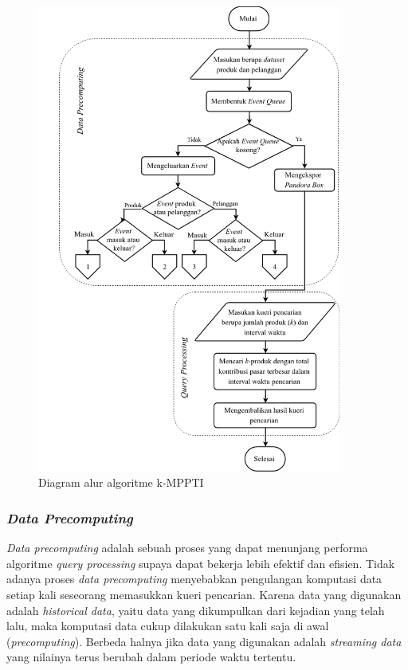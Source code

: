 \begin{figure}[H]
	\centering
	\includegraphics[width=10cm]{assets/img/bab3/flowchart.png}
	\caption{Diagram alur algoritme k-MPPTI}
	\label{fig:diagram-alur1}
\end{figure}

\subsubsection{\textit{Data Precomputing}}
\tab \textit{Data precomputing} adalah sebuah proses yang dapat menunjang performa algoritme \textit{query processing} supaya dapat bekerja lebih efektif dan efisien. Tidak adanya proses \textit{data precomputing} menyebabkan pengulangan komputasi data setiap kali seseorang memasukkan kueri pencarian. Karena data yang digunakan adalah \textit{historical data}, yaitu data yang dikumpulkan dari kejadian yang telah lalu, maka komputasi data cukup dilakukan satu kali saja di awal (\textit{precomputing}). Berbeda halnya jika data yang digunakan adalah \textit{streaming data} yang nilainya terus berubah dalam periode waktu tertentu.
	
